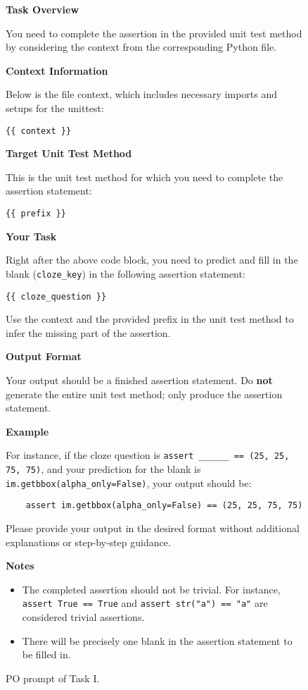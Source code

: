 

\begin{figure}[t]
    \centering

\begin{tcolorbox}[colback=blue!5!white, colframe=blue!75!black,title=Task I (Problem Only)]

\textbf{Task Overview}

You need to complete the assertion in the provided unit test method by considering the context from the corresponding Python file.

\textbf{Context Information}

Below is the file context, which includes necessary imports and setups for the unittest:
\begin{verbatim}
{{ context }}
\end{verbatim}

\textbf{Target Unit Test Method}

This is the unit test method for which you need to complete the assertion statement:
\begin{verbatim}
{{ prefix }}
\end{verbatim}

\textbf{Your Task}

Right after the above code block, you need to predict and fill in the blank (\texttt{{cloze\_key}}) in the following assertion statement:
\begin{verbatim}
{{ cloze_question }}
\end{verbatim}
Use the context and the provided prefix in the unit test method to infer the missing part of the assertion.

\textbf{Output Format}

Your output should be a finished assertion statement. Do \textbf{not} generate the entire unit test method; only produce the assertion statement.

\textbf{Example}

For instance, if the cloze question is \texttt{assert \_\_\_\_\_\_ == (25, 25, 75, 75)}, and your prediction for the blank is \texttt{im.getbbox(alpha\_only=False)}, your output should be:

\begin{verbatim}
    assert im.getbbox(alpha_only=False) == (25, 25, 75, 75)
\end{verbatim}

Please provide your output in the desired format without additional explanations or step-by-step guidance.

\textbf{Notes}

\begin{itemize}
    \item The completed assertion should not be trivial. For instance, \texttt{assert True == True} and \texttt{assert str("a") == "a"} are considered trivial assertions.
    \item There will be precisely one blank in the assertion statement to be filled in.
\end{itemize}

\end{tcolorbox}

    \caption{PO prompt of Task I.}
    \label{fig:task1po}
\end{figure}

